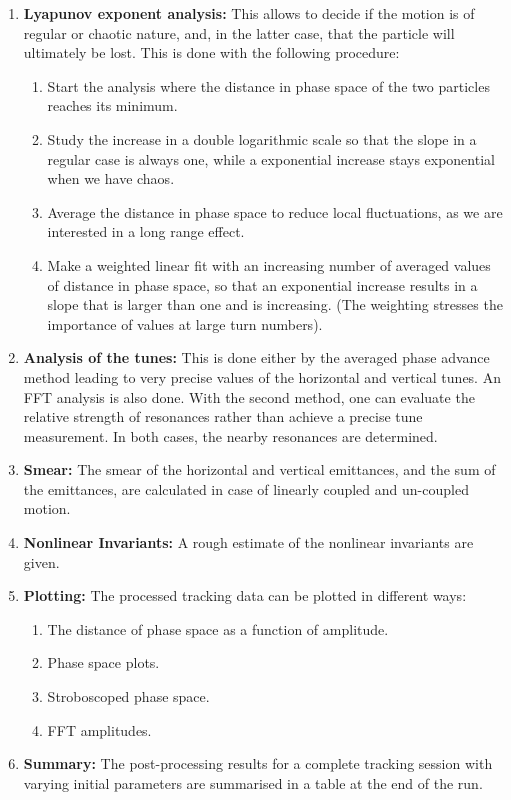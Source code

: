 \begin{enumerate}
    \item \textbf{Lyapunov exponent analysis:} This allows to decide if the motion is of regular or chaotic nature, and, in the latter case, that the particle will ultimately be lost. This is done with the following procedure:
    \begin{enumerate}
        \item Start the analysis where the distance in phase space of the two particles reaches its minimum.
        \item Study the increase in a double logarithmic scale so that the slope in a regular case is always one, while a exponential increase stays exponential when we have chaos.
        \item Average the distance in phase space to reduce local fluctuations, as we are interested in a long range effect.
        \item Make a weighted linear fit with an increasing number of averaged values of distance in phase space, so that an exponential increase results in a slope that is larger than one and is increasing. (The weighting stresses the importance of values at large turn numbers).
    \end{enumerate}
    \item \textbf{Analysis of the tunes:} This is done either by the averaged phase advance method leading to very precise values of the horizontal and vertical tunes. An FFT analysis is also done. With the second method, one can evaluate the relative strength of resonances rather than achieve a precise tune measurement. In both cases, the nearby resonances are determined.
    \item \textbf{Smear:} The smear of the horizontal and vertical emittances, and the sum of the emittances, are calculated in case of linearly coupled and un-coupled motion.
    \item \textbf{Nonlinear Invariants:} A rough estimate of the nonlinear invariants are given.
    \item \textbf{Plotting:} The processed tracking data can be plotted in different ways:
    \begin{enumerate}
        \item The distance of phase space as a function of amplitude.
        \item Phase space plots.
        \item Stroboscoped phase space.
        \item FFT amplitudes.
    \end{enumerate}
    \item \textbf{Summary:} The post-processing results for a complete tracking session with varying initial parameters are summarised in a table at the end of the run.
\end{enumerate}


